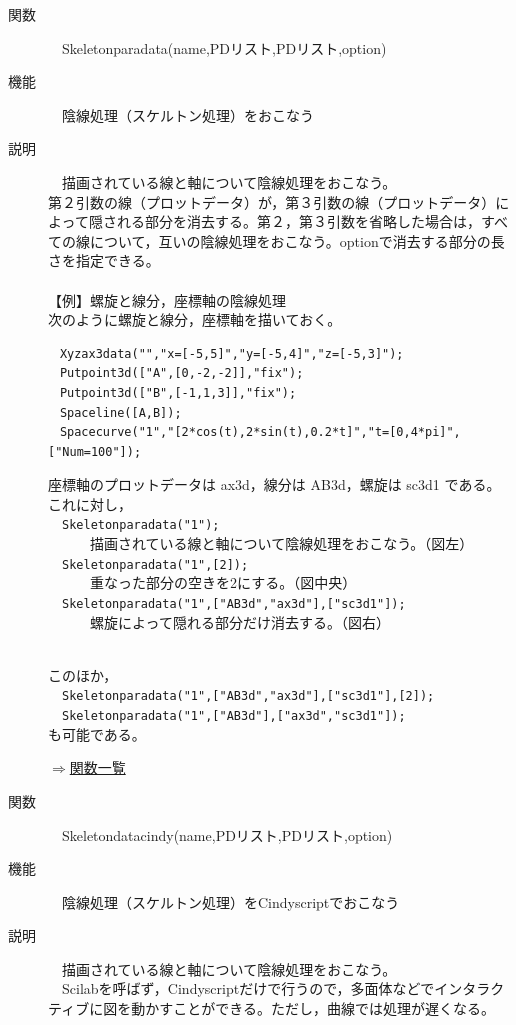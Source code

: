 \documentclass[papersize,a4paper,12pt,uplatex]{jsarticle}
\begin{document}
\begin{description}
\hypertarget{skeletonparadata}{}
\item[関数]　Skeletonparadata(name,PDリスト,PDリスト,option)
\item[機能]　陰線処理（スケルトン処理）をおこなう
\item[説明]　描画されている線と軸について陰線処理をおこなう。\\
第２引数の線（プロットデータ）が，第３引数の線（プロットデータ）によって隠される部分を消去する。第２，第３引数を省略した場合は，すべての線について，互いの陰線処理をおこなう。optionで消去する部分の長さを指定できる。\\
　\\
【例】螺旋と線分，座標軸の陰線処理\\
次のように螺旋と線分，座標軸を描いておく。
\begin{verbatim}
　Xyzax3data("","x=[-5,5]","y=[-5,4]","z=[-5,3]");
　Putpoint3d(["A",[0,-2,-2]],"fix");
　Putpoint3d(["B",[-1,1,3]],"fix");
　Spaceline([A,B]);
　Spacecurve("1","[2*cos(t),2*sin(t),0.2*t]","t=[0,4*pi]",["Num=100"]);
\end{verbatim}
座標軸のプロットデータは ax3d，線分は AB3d，螺旋は sc3d1 である。これに対し，\\
　\verb|Skeletonparadata("1");|\\
　　　描画されている線と軸について陰線処理をおこなう。（図左）\\
　\verb|Skeletonparadata("1",[2]);|\\
　　　重なった部分の空きを2にする。（図中央）\\
　\verb|Skeletonparadata("1",["AB3d","ax3d"],["sc3d1"]);|\\
　　　螺旋によって隠れる部分だけ消去する。（図右）\\

　　
　　

このほか，\\
　\verb|Skeletonparadata("1",["AB3d","ax3d"],["sc3d1"],[2]);|\\
　\verb|Skeletonparadata("1",["AB3d"],["ax3d","sc3d1"]);|\\
も可能である。

\begin{flushright} \hyperlink{functionlist3d}{$\Rightarrow$関数一覧}\end{flushright}

\hypertarget{skeletondatacindy}{}
\item[関数]　Skeletondatacindy(name,PDリスト,PDリスト,option)
\item[機能]　陰線処理（スケルトン処理）をCindyscriptでおこなう
\item[説明]　描画されている線と軸について陰線処理をおこなう。\\
　Scilabを呼ばず，Cindyscriptだけで行うので，多面体などでインタラクティブに図を動かすことができる。ただし，曲線では処理が遅くなる。\\



\end{description}
\end{document}
